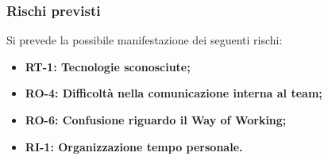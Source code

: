\documentclass[a4paper,12pt]{article}
\begin{document}
        \subsubsection{Rischi previsti}{
            Si prevede la possibile manifestazione dei seguenti rischi:
            \begin{itemize}
                \item \textbf{RT-1: Tecnologie sconosciute;}
                \item \textbf{RO-4: Difficoltà nella comunicazione interna al team;}
                \item \textbf{RO-6: Confusione riguardo il Way of Working;}
                \item \textbf{RI-1: Organizzazione tempo personale.}
            \end{itemize}
        }
\end{document}

